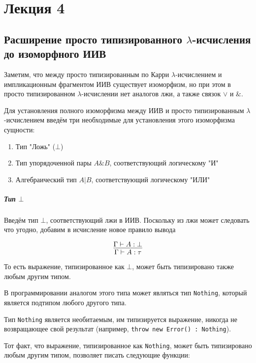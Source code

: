 \section{Лекция 4}

\subsection{Расширение просто типизированного $\lambda$-исчисления \\до изоморфного ИИВ}

Заметим, что между просто типизированным по Карри $\lambda$-исчислением и импликационным фрагментом ИИВ существует изоморфизм, но при этом в просто типизированном $\lambda$-исчислении нет аналогов лжи, а также связок $\vee$ и $\&$.

Для установления полного изоморфизма между ИИВ и просто типизированным $\lambda$-исчислением введём три необходимые для установления этого изоморфизма сущности:

\begin{enumerate}
	\item Тип "Ложь" ($\bot$)
	
	\item Тип упорядоченной пары $A\&B$, соответствующий	логическому "И"
	
	\item Алгебраический тип $A | B$, соответствующий логическому "ИЛИ"
\end{enumerate}

\subparagraph{Тип $\bot$}

Введём тип $\bot$, соответствующий лжи в ИИВ. Поскольку из лжи может следовать что угодно, добавим в исчисление новое правило вывода

\[
\infer{\Gamma \vdash A : \tau}{\Gamma \vdash A: \bot}
\]

То есть выражение, типизированное как $\bot$, может быть типизировано также любым другим типом.

В программировании аналогом этого типа может являться тип \texttt{Nothing}, который является подтипом любого другого типа.

Тип \texttt{Nothing} является необитаемым, им типизируется выражение, никогда не возвращающее свой результат (например, \texttt{throw new Error() : Nothing}). 

Тот факт, что выражение, типизированное как \texttt{Nothing}, может быть типизировано любым другим типом, позволяет писать следующие функции:

